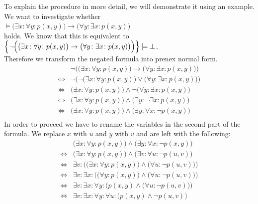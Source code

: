 To explain the procedure in more detail, we will demonstrate it using an example. 
We want to investigate whether 
\\[0.2cm]
\hspace*{1.3cm} 
$\models \big(\exists x\colon \forall y\colon  p(x,y)\big) \rightarrow \big(\forall y\colon \exists x\colon p(x,y)\big)$ \\[0.2cm]
holds. We know that this is equivalent to  \\[0.2cm]
\hspace*{1.3cm} 
$\Big\{ \neg \Big(\big(\exists x\colon \forall y\colon  p(x,y)\big) \rightarrow  \big(\forall y\colon \exists
x\colon p(x,y)\big)\Big)\Big\} \models \bot$.
\\[0.2cm]
Therefore we transform the negated formula into prenex normal form.
$$
\begin{array}{ll}
                  & \neg \Big(\big(\exists x\colon \forall y\colon  p(x,y)\big) \rightarrow \big(\forall y\colon \exists x\colon p(x,y)\big)\Big) \\
  \Leftrightarrow & \neg \Big(\neg \big(\exists x\colon \forall y\colon  p(x,y)\big) \vee \big(\forall y\colon \exists x\colon p(x,y)\big)\Big) \\
  \Leftrightarrow &                \big(\exists x\colon \forall y\colon  p(x,y)\big) \wedge \neg \big(\forall y\colon \exists x\colon p(x,y)\big) \\
  \Leftrightarrow &\big(\exists x\colon \forall y\colon  p(x,y)\big) \wedge  \big(\exists y\colon  \neg \exists x\colon p(x,y)\big) \\
  \Leftrightarrow &\big(\exists x\colon \forall y\colon  p(x,y)\big) \wedge  \big(\exists y\colon  \forall x\colon \neg p(x,y)\big) \\
\end{array}
$$
In order to proceed we have to rename the variables in the second part of the formula.
We replace $x$ with $u$ and $y$ with $v$ and are left with the following:
$$
\begin{array}{ll}
                  &\big(\exists x\colon \forall y\colon  p(x,y)\big) \wedge  \big(\exists y\colon  \forall x\colon \neg p(x,y)\big) \\
  \Leftrightarrow &\big(\exists x\colon \forall y\colon  p(x,y)\big) \wedge  \big(\exists v\colon  \forall u\colon \neg p(u,v)\big) \\
  \Leftrightarrow &\exists v\colon  \Big( \big(\exists x\colon \forall y\colon  p(x,y)\big) \wedge  \big(\forall u\colon \neg p(u,v)\big) \Big)\\
  \Leftrightarrow &\exists v\colon  \exists x\colon  \Big( \big(\forall y\colon  p(x,y)\big) \wedge \big(\forall u\colon \neg p(u,v)\big) \Big)\\
  \Leftrightarrow &\exists v\colon  \exists x\colon \forall y\colon \Big( p(x,y) \wedge \big(\forall u\colon \neg p(u,v)\big) \Big)\\
  \Leftrightarrow &\exists v\colon  \exists x\colon \forall y\colon \forall u\colon \Big( p(x,y) \wedge \neg p(u,v) \Big)\\
\end{array}
$$
